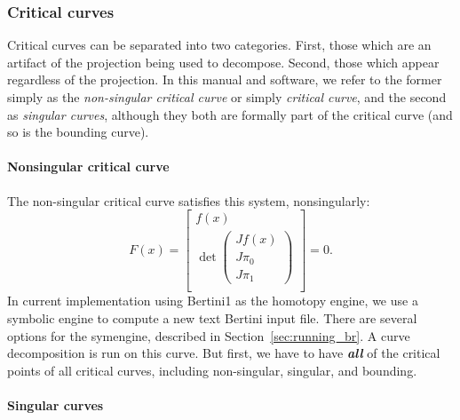 \subsubsection{Critical curves}

Critical curves can be separated into two categories.  First, those which are an artifact of the projection being used to decompose.  Second, those which appear regardless of the projection.  In this manual and software, we refer to the former simply as the {\em non-singular critical curve} or simply {\em critical curve}, and the second as {\em singular curves}, although they both are formally part of the critical curve (and so is the bounding curve).


\paragraph{Nonsingular critical curve}

The non-singular critical curve satisfies this system, nonsingularly:
\begin{equation}\label{eqn:crit_curve}
    F(x) = \begin{bmatrix}
f(x) \\
\det \begin{pmatrix}
    Jf(x) \\
    J\pi_0 \\
    J\pi_1
            \end{pmatrix} \\
\end{bmatrix} = 0.
\end{equation}
In current implementation using Bertini1 as the homotopy engine, we use a symbolic engine to compute a new text Bertini input file.  There are several options for the symengine, described in Section~\ref{sec:running_br}.  A curve decomposition is run on this curve.  But first, we have to have {\em \bf all} of the critical points of all critical curves, including non-singular, singular, and bounding.


\paragraph{Singular curves}

